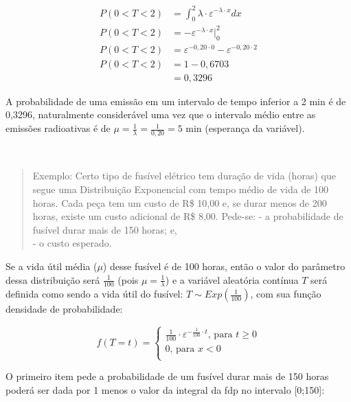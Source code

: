 \documentclass[
]{book}
\begin{document}
\hfill\break

\begin{align*}
P( 0 < T < 2) & = \int_{0}^{2}  \lambda \cdot \varepsilon ^{- \lambda \cdot x} dx  \\ 
P( 0 < T < 2) & = - \varepsilon^{-\lambda \cdot x} \rvert_{0}^{2}  \\  
P( 0 < T < 2) & = \varepsilon^{- 0,20 \cdot 0} - \varepsilon^{- 0,20 \cdot 2} \\ 
P( 0 < T < 2) & = 1  - 0,6703 \\
              & = 0,3296
\end{align*}

\hfill\break

A probabilidade de uma emissão em um intervalo de tempo inferior a 2 min é de 0,3296, naturalmente considerável uma vez que o intervalo médio entre as emissões radioativas é de \(\mu = \frac{1}{\lambda}=\frac{1}{0,20}= 5\) min (esperança da variável).\\
\strut \\

\begin{quote}
Exemplo: Certo tipo de fusível elétrico tem duração de vida (horas) que segue uma Distribuição Exponencial com tempo médio de vida de 100 horas. Cada peça tem um custo de R\$ 10,00 e, se durar menos de 200 horas, existe um custo adicional de R\$ 8,00. Pede-se:
- a probabilidade de fusível durar mais de 150 horas; e,\\
- o custo esperado.
\end{quote}

\hfill\break

Se a vida útil média (\(\mu\)) desse fusível é de 100 horas, então o valor do parâmetro dessa distribuição será \(\frac{1}{100}\) (pois \(\mu=\frac{1}{\lambda}\)) e a variável aleatória contínua \(T\) será definida como sendo a vida útil do fusível: \(T \sim Exp (\frac{1}{100})\), com sua função densidade de probabilidade:

\hfill\break

\[
f(T=t)=
\begin{cases}
    \frac{1}{100} \cdot \varepsilon ^{-  \frac{1}{100} \cdot t} \text{, para } t \ge 0 \\
    0 \text{, para } x < 0\\
\end{cases}
\]

O primeiro item pede a probabilidade de um fusível durar mais de 150 horas poderá ser dada por 1 menos o valor da integral da fdp no intervalo {[}0;150{]}:
\end{document}

